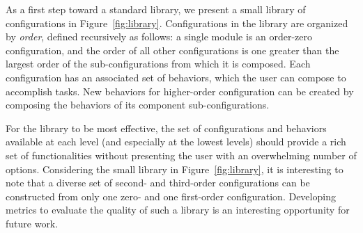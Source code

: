 \documentclass[graybox]{svmult}
\begin{document}
As a first step toward a standard library, we present a small library of configurations
in Figure~\ref{fig:library}.
Configurations in the library are organized by \textit{order}, defined recursively
as follows: a single module is an order-zero configuration, and the order of all
other configurations is one greater than the largest order of the sub-configurations
from which it is composed. Each configuration has an associated set of behaviors,
which the user can compose to accomplish tasks.  New behaviors for higher-order configuration can be created by composing the behaviors of its component sub-configurations.

For the library to be most effective, the set of configurations and behaviors available
 at each level (and especially at the lowest levels) should provide a rich set of
 functionalities without presenting the user with an overwhelming number of options. 
 Considering the small library in Figure~\ref{fig:library},
 it is interesting to note that a diverse set of second- and third-order configurations can
be constructed from only one zero- and one first-order configuration. Developing metrics to
evaluate the quality of such a library is an interesting opportunity for future work. 
%
\end{document}
